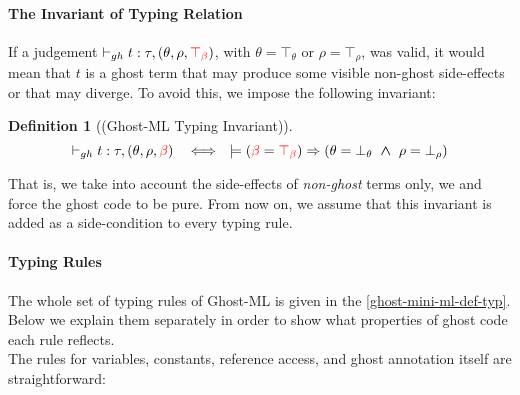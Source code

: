\documentclass[a4paper,11pt,oneside]{article}
\theoremstyle{plain}
\newtheorem{definition}{Definition}[subsection]
\newcommand{\bwedge}{\boldsymbol{~\wedge~}}
\newcommand{\bth}{\bot_\theta}
\newcommand{\brh}{\bot_\rho}
\newcommand{\tth}{\top_\theta}
\newcommand{\trh}{\top_\rho}
\newcommand{\gb}{\beta}
\newcommand{\gbt}{\top_\beta}
\newcommand{\gbr}{\textcolor{red}{\gb}}
\newcommand{\gbtr}{\textcolor{red}{\gbt}}
\begin{document}
\paragraph*{The Invariant of Typing Relation}	
	
If a judgement $\vdash_{gh} t : \tau, (\theta, \rho, \gbtr)$, with
$\theta = \tth$ or $\rho = \trh $, was valid, it would mean that $t$
is a ghost term that may produce some visible non-ghost side-effects
or that may diverge.
%
To avoid this, we impose the following invariant:
\hypertarget{gh-typ-inv}{}
\begin{definition}[(Ghost-ML Typing Invariant)]
 $$\vdash_{gh} t : \tau, (\theta, \rho, \gbr) 
 ~~ \iff ~~
\models (\gbr = \gbtr) \Rightarrow (\theta = \bth \bwedge \rho = \brh) $$
\end{definition}   
That is, we take into account the side-effects of \textit{non-ghost} terms only, we and force the ghost code to be pure. 
From now on, we assume that this invariant is added as a side-condition to every typing rule.

\paragraph*{Typing Rules}	

The whole set of typing rules of Ghost-ML is given in the \cref{ghost-mini-ml-def-typ}.
Below we explain them separately in order to show what properties of ghost code each rule reflects. \\

The rules for variables, constants, reference access, and ghost annotation itself are straightforward:  
\end{document}
